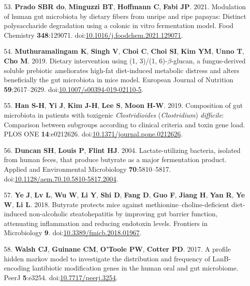 \documentclass[
  12pt,
]{article}
\newenvironment{cslreferences}%
  {}%
  {\par}
\begin{document}
\begin{cslreferences}
\leavevmode\hypertarget{ref-doPrado2021}{}%
53. \textbf{Prado SBR do}, \textbf{Minguzzi BT}, \textbf{Hoffmann C},
\textbf{Fabi JP}. 2021. Modulation of human gut microbiota by dietary
fibers from unripe and ripe papayas: Distinct polysaccharide degradation
using a colonic in vitro fermentation model. Food Chemistry
\textbf{348}:129071.
doi:\href{https://doi.org/10.1016/j.foodchem.2021.129071}{10.1016/j.foodchem.2021.129071}.

\leavevmode\hypertarget{ref-Muthuramalingam2019}{}%
54. \textbf{Muthuramalingam K}, \textbf{Singh V}, \textbf{Choi C},
\textbf{Choi SI}, \textbf{Kim YM}, \textbf{Unno T}, \textbf{Cho M}.
2019. Dietary intervention using (1, 3)/(1, 6)-\(\beta\)-glucan, a
fungus-derived soluble prebiotic ameliorates high-fat diet-induced
metabolic distress and alters beneficially the gut microbiota in mice
model. European Journal of Nutrition \textbf{59}:2617--2629.
doi:\href{https://doi.org/10.1007/s00394-019-02110-5}{10.1007/s00394-019-02110-5}.

\leavevmode\hypertarget{ref-Han2019}{}%
55. \textbf{Han S-H}, \textbf{Yi J}, \textbf{Kim J-H}, \textbf{Lee S},
\textbf{Moon H-W}. 2019. Composition of gut microbiota in patients with
toxigenic \emph{Clostridioides} (\emph{Clostridium}) \emph{difficile}:
Comparison between subgroups according to clinical criteria and toxin
gene load. PLOS ONE \textbf{14}:e0212626.
doi:\href{https://doi.org/10.1371/journal.pone.0212626}{10.1371/journal.pone.0212626}.

\leavevmode\hypertarget{ref-Duncan2004}{}%
56. \textbf{Duncan SH}, \textbf{Louis P}, \textbf{Flint HJ}. 2004.
Lactate-utilizing bacteria, isolated from human feces, that produce
butyrate as a major fermentation product. Applied and Environmental
Microbiology \textbf{70}:5810--5817.
doi:\href{https://doi.org/10.1128/aem.70.10.5810-5817.2004}{10.1128/aem.70.10.5810-5817.2004}.

\leavevmode\hypertarget{ref-Ye2018}{}%
57. \textbf{Ye J}, \textbf{Lv L}, \textbf{Wu W}, \textbf{Li Y},
\textbf{Shi D}, \textbf{Fang D}, \textbf{Guo F}, \textbf{Jiang H},
\textbf{Yan R}, \textbf{Ye W}, \textbf{Li L}. 2018. Butyrate protects
mice against methionine--choline-deficient diet-induced non-alcoholic
steatohepatitis by improving gut barrier function, attenuating
inflammation and reducing endotoxin levels. Frontiers in Microbiology
\textbf{9}.
doi:\href{https://doi.org/10.3389/fmicb.2018.01967}{10.3389/fmicb.2018.01967}.

\leavevmode\hypertarget{ref-Walsh2017}{}%
58. \textbf{Walsh CJ}, \textbf{Guinane CM}, \textbf{O'Toole PW},
\textbf{Cotter PD}. 2017. A profile hidden markov model to investigate
the distribution and frequency of LanB-encoding lantibiotic modification
genes in the human oral and gut microbiome. PeerJ \textbf{5}:e3254.
doi:\href{https://doi.org/10.7717/peerj.3254}{10.7717/peerj.3254}.


\end{cslreferences}
\end{document}
